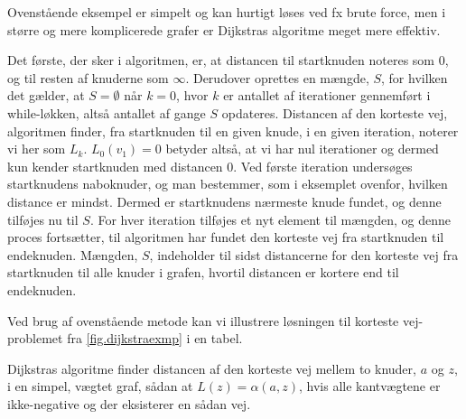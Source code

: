 Ovenstående eksempel er simpelt og kan hurtigt løses ved fx brute force, men i større og mere komplicerede grafer er Dijkstras algoritme meget mere effektiv.

Det første, der sker i algoritmen, er, at distancen til startknuden noteres som $0$, og til resten af knuderne som $\infty$. Derudover oprettes en mængde, $S$, for hvilken det gælder, at $S = \emptyset$ når $k = 0$, hvor $k$ er antallet af iterationer gennemført i while-løkken, altså antallet af gange $S$ opdateres. Distancen af den korteste vej, algoritmen finder, fra startknuden til en given knude, i en given iteration, noterer vi her som $L_k$. $L_{0}(v_1)=0$ betyder altså, at vi har nul iterationer og dermed kun kender startknuden med distancen $0$. Ved første iteration undersøges startknudens naboknuder, og man bestemmer, som i eksemplet ovenfor, hvilken distance er mindst. Dermed er startknudens nærmeste knude fundet, og denne tilføjes nu til $S$. For hver iteration tilføjes et nyt element til mængden, og denne proces fortsætter, til algoritmen har fundet den korteste vej fra startknuden til endeknuden. Mængden, $S$, indeholder til sidst distancerne for den korteste vej fra startknuden til alle knuder i grafen, hvortil distancen er kortere end til endeknuden. 

Ved brug af ovenstående metode kan vi illustrere løsningen til korteste vej-problemet fra \autoref{fig.dijkstraexmp} i en tabel.



\begin{thm} \label{thm:dijkstra}
Dijkstras algoritme finder distancen af den korteste vej mellem to knuder, $a$ og $z$, i en simpel, vægtet graf, sådan at $L(z)=\alpha(a,z)$, hvis alle kantvægtene er ikke-negative og der eksisterer en sådan vej. 
\end{thm}

